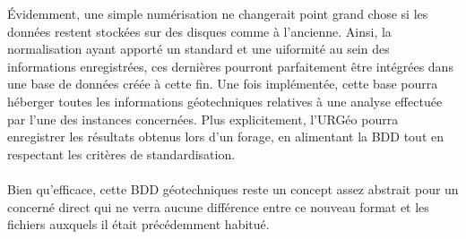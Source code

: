 \par
Évidemment, une simple numérisation ne changerait point grand chose 
si les données restent stockées sur des disques comme à l'ancienne. Ainsi, 
la normalisation ayant apporté un standard et une uiformité au sein des informations 
enregistrées, ces dernières pourront parfaitement être intégrées dans 
une base de données créée à cette fin. Une fois implémentée, cette 
base pourra héberger toutes les informations géotechniques relatives 
à une analyse effectuée par l'une des instances concernées. Plus 
explicitement, l'URGéo pourra enregistrer les résultats obtenus lors 
d'un forage, en alimentant la BDD tout en respectant les critères de 
standardisation.
\paragraph{}
Bien qu'efficace, cette BDD géotechniques reste un concept assez 
abstrait pour un concerné direct qui ne verra aucune différence 
entre ce nouveau format et les fichiers auxquels il était 
précédemment habitué.